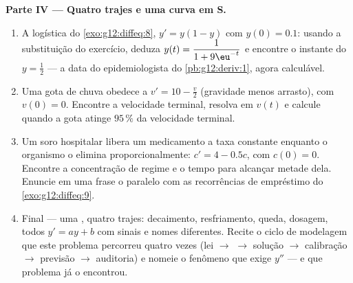 \begin{problem}
\medskip
\noindent\textbf{Parte IV --- Quatro trajes e uma curva em S.}
\begin{enumerate}[resume]
  \item A  logística do \cref{exo:g12:diffeq:8},
        $y' = y(1 - y)$ com $y(0) = 0.1$: usando a substituição
        do exercício, deduza
        $y(t) = \dfrac{1}{1 + 9\eu^{-t}}$ e encontre o instante
        do  $y = \frac12$ --- a data do
        epidemiologista do \cref{pb:g12:deriv:1}, agora
        calculável.
  \item Uma gota de chuva obedece a $v' = 10 - \frac v2$
        (gravidade menos arrasto), com $v(0) = 0$. Encontre a
        velocidade terminal, resolva em $v(t)$ e calcule quando a
        gota atinge $95\,\%$ da velocidade terminal.
  \item Um soro hospitalar libera um medicamento a taxa constante
        enquanto o organismo o elimina proporcionalmente:
        $c' = 4 - 0.5c$, com $c(0) = 0$. Encontre a concentração
        de regime e o tempo para alcançar metade dela. Enuncie em
        uma frase o paralelo com as recorrências de empréstimo
        do \cref{exo:g12:diffeq:9}.
  \item Final --- uma , quatro trajes: decaimento,
        resfriamento, queda, dosagem, todos $y' = ay + b$ com
        sinais e nomes diferentes. Recite o ciclo de modelagem
        que este problema percorreu quatro vezes (lei $\to$
         $\to$ solução $\to$ calibração $\to$ previsão
        $\to$ auditoria) e nomeie o fenômeno que exige $y''$ ---
        e que problema já o encontrou.
\end{enumerate}
\end{problem}
